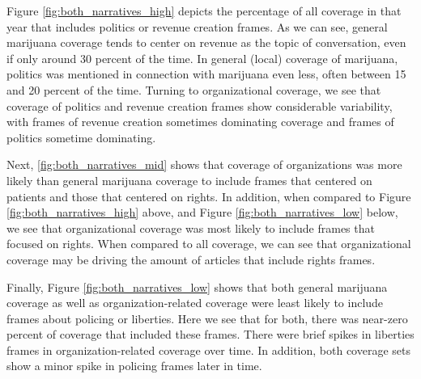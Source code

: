 Figure \ref{fig:both_narratives_high} depicts the percentage of all coverage in that year that includes politics or revenue creation frames. As we can see, general marijuana coverage tends to center on revenue as the topic of conversation, even if only around 30 percent of the time. In general (local) coverage of marijuana, politics was mentioned in connection with marijuana even less, often between 15 and 20 percent of the time. Turning to organizational coverage, we see that coverage of politics and revenue creation frames show considerable variability, with frames of revenue creation sometimes dominating coverage and frames of politics sometime dominating. 






Next, \ref{fig:both_narratives_mid} shows that coverage of organizations was more likely than general marijuana coverage to include frames that centered on patients and those that centered on rights. In addition, when compared to Figure \ref{fig:both_narratives_high} above, and Figure \ref{fig:both_narratives_low} below, we see that organizational coverage was most likely to include frames that focused on rights. When compared to all coverage, we can see that organizational coverage may be driving the amount of articles that include rights frames. 




Finally, Figure \ref{fig:both_narratives_low} shows that both general marijuana coverage as well as organization-related coverage were least likely to include frames about policing or liberties. Here we see that for both, there was near-zero percent of coverage that included these frames. There were brief spikes in liberties frames in organization-related coverage over time. In addition, both coverage sets show a minor spike in policing frames later in time. 




